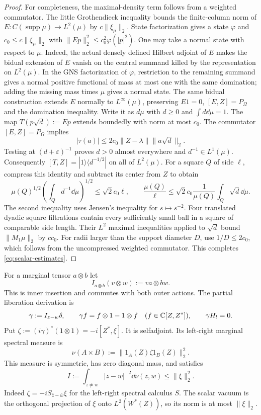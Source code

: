 \begin{proof}
For completeness, the maximal-density term follows from a weighted commutator.
The little Grothendieck inequality \cite[Theorem~5.2]{Pis12} bounds the finite-column norm of $E:C(\operatorname{supp}\mu)\to L^2(\mu)$ by $c\|\xi_\mu\|_2$.
State factorization gives a state $\varphi$ and $c_0\le c\|\xi_\mu\|_2$ with $\|Ep\|_2^2\le c_0^2\varphi(|p|^2)$.
One may take a normal state with respect to $\mu$.
Indeed, the actual densely defined Hilbert adjoint of $E$ makes the bidual extension of $E$ vanish on the central summand killed by the representation on $L^2(\mu)$.
In the GNS factorization of $\varphi$, restriction to the remaining summand gives a normal positive functional of mass at most one with the same domination; adding the missing mass times $\mu$ gives a normal state.
The same bidual construction extends $E$ normally to $L^\infty(\mu)$, preserving $E1=0$, $[E,Z]=P_\Omega$ and the domination inequality.
Write it as $d\mu$ with $d\ge0$ and $\int d\dd\mu=1$.
The map $T(p\sqrt d):=Ep$ extends boundedly with norm at most $c_0$.
The commutator $[E,Z]=P_\Omega$ implies
\[
 |\tau(a)|\le2c_0\|Z-\lambda\|\|a\sqrt d\|_2.
\]
Testing at $(d+\varepsilon)^{-1}$ proves $d>0$ almost everywhere and $d^{-1}\in L^1(\mu)$.
Consequently $[T,Z]=|1\rangle\langle d^{-1/2}|$ on all of $L^2(\mu)$.
For a square $Q$ of side $\ell$, compress this identity and subtract its center from $Z$ to obtain
\[
 \mu(Q)^{1/2}\left(\int_Qd^{-1}\dd\mu\right)^{1/2}
 \le\sqrt2 c_0\ell,\qquad
 \frac{\mu(Q)}\ell\le\sqrt2 c_0\frac1{\mu(Q)}\int_Q\sqrt d\dd\mu.
\]
The second inequality uses Jensen's inequality for $s\mapsto s^{-2}$.
Four translated dyadic square filtrations contain every sufficiently small ball in a square of comparable side length.
Their $L^2$ maximal inequalities applied to $\sqrt d$ bound $\|M_1\mu\|_2$ by $cc_0$.
For radii larger than the support diameter $D$, use $1/D\le2c_0$, which follows from the uncompressed weighted commutator.
This completes \eqref{eq:scalar-estimates}.
\end{proof}

For a marginal tensor $a\otimes b$ let
\[
 I_{a\otimes b}(v\otimes w):=va\otimes bw.
\]
This is inner insertion and commutes with both outer actions.
The partial liberation derivation is
\[
 \gamma:=I_{z-w}\delta,
 \qquad \gamma f=f\otimes1-1\otimes f\quad(f\in\mathbb C[Z,Z^*]),
 \qquad \gamma H_l=0.
\]
Put $\zeta:=(i\gamma)^*(1\otimes1)=-i[Z^*,\xi]$.
It is selfadjoint.
Its left-right marginal spectral measure is
\[
 \nu(A\times B):=\|1_A(Z)\zeta1_B(Z)\|_2^2.
\]
This measure is symmetric, has zero diagonal mass, and satisfies
\begin{equation}\label{eq:gap-budget}
 I:=\int_{z\ne w}|z-w|^{-2}\dd\nu(z,w)\le\|\xi\|_2^2.
\end{equation}
Indeed $\zeta=-iS_{\bar z-\bar w}\xi$ for the left-right spectral calculus $S$.
The scalar vacuum is the orthogonal projection of $\xi$ onto $L^2(W^*(Z))$, so its norm is at most $\|\xi\|_2$.

